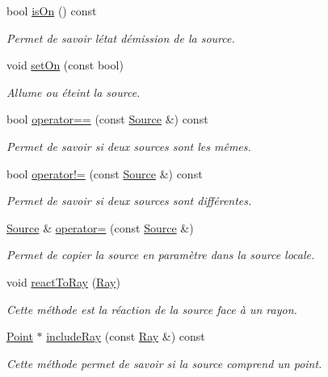 \begin{DoxyCompactItemize}
bool \hyperlink{classSource_ac6ec1663e9a294d6879a7ccc241cbf1b}{is\+On} () const 
\begin{DoxyCompactList}\small\item\em Permet de savoir l\textquotesingle{}état d\textquotesingle{}émission de la source. \end{DoxyCompactList}\item 
void \hyperlink{classSource_aee33db3751f8acde346a713254a5ceea}{set\+On} (const bool)
\begin{DoxyCompactList}\small\item\em Allume ou éteint la source. \end{DoxyCompactList}\item 
bool \hyperlink{classSource_a568cc17208751ca3dc56348b29231f31}{operator==} (const \hyperlink{classSource}{Source} \&) const 
\begin{DoxyCompactList}\small\item\em Permet de savoir si deux sources sont les mêmes. \end{DoxyCompactList}\item 
bool \hyperlink{classSource_a5b02a738eaddd67ede3739a4f8ecd0fe}{operator!=} (const \hyperlink{classSource}{Source} \&) const 
\begin{DoxyCompactList}\small\item\em Permet de savoir si deux sources sont différentes. \end{DoxyCompactList}\item 
\hyperlink{classSource}{Source} \& \hyperlink{classSource_a0b28dc1b1b1a7d125cca3fac3c40083d}{operator=} (const \hyperlink{classSource}{Source} \&)
\begin{DoxyCompactList}\small\item\em Permet de copier la source en paramètre dans la source locale. \end{DoxyCompactList}\item 
void \hyperlink{classSource_a425f400307f756ca8e39e5cfddb3d528}{react\+To\+Ray} (\hyperlink{classRay}{Ray})
\begin{DoxyCompactList}\small\item\em Cette méthode est la réaction de la source face à un rayon. \end{DoxyCompactList}\item 
\hyperlink{classPoint}{Point} $\ast$ \hyperlink{classSource_add4e9c5a8829777d5c522622ad31f431}{include\+Ray} (const \hyperlink{classRay}{Ray} \&) const 
\begin{DoxyCompactList}\small\item\em Cette méthode permet de savoir si la source comprend un point. \end{DoxyCompactList}\end{DoxyCompactItemize}
